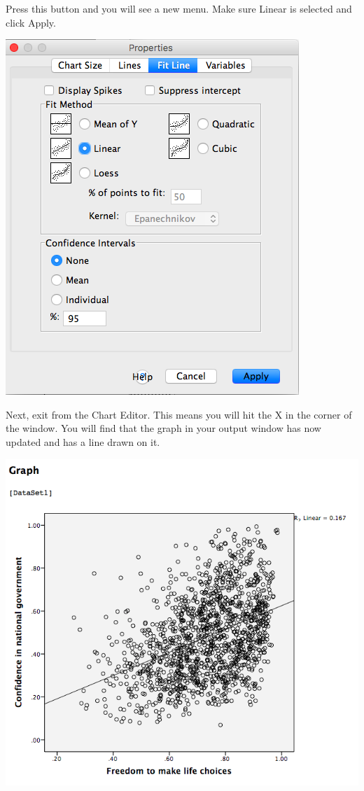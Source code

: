 \documentclass[
]{book}
\begin{document}
Press this button and you will see a new menu. Make sure {Linear} is selected and click {Apply}.

\includegraphics{img/3.4.28.png}

Next, exit from the Chart Editor. This means you will hit the {X} in the corner of the window. You will find that the graph in your output window has now updated and has a line drawn on it.

\includegraphics{img/3.4.29.png}
\end{document}
